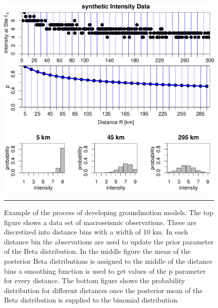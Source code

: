 \begin{figure}[!htpb]
 \centering
		\includegraphics[scale=0.6]{Figures/example.pdf}
		\rule{35em}{0.5pt}
	\caption[Example]{Example of the process of developing groundmotion models. The top figure shows a data set of macroseismic observations. These are discretized into distance bins with a width of 10 km. In each distance bin the abservations are used to update the prior parameter of the Beta distribution. In the middle figure the mean of the posterior Beta distributions is assigned to the middle of the distance bins a smoothing function is used to get values of the p parameter for every distance. The bottom figure shows the probability distribution for different distances once the posterior mean of the Beta distribution is supplied to the binomial distribution.}
	\label{fig:example}
\end{figure}

